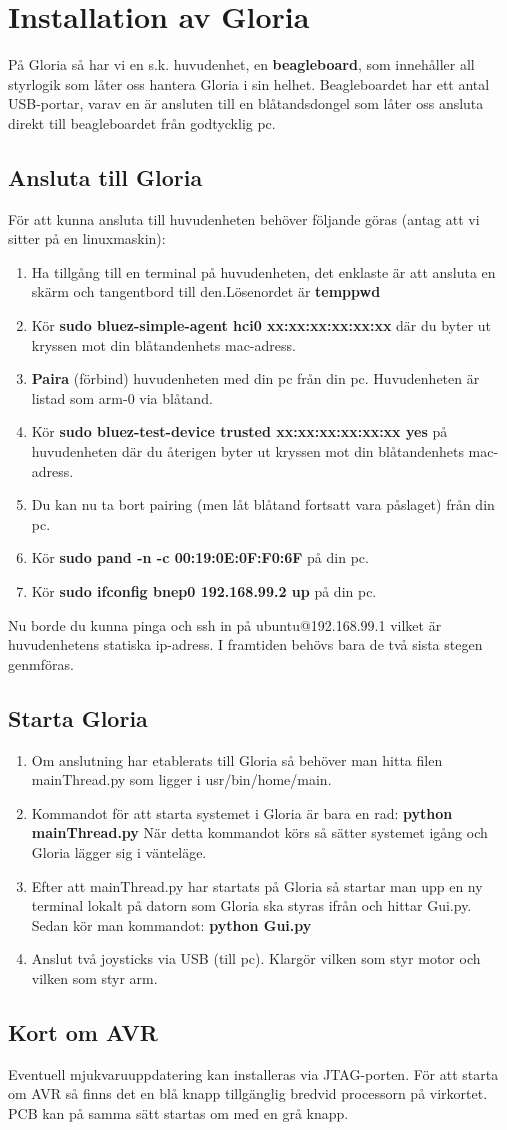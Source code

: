\section{Installation av Gloria}
På Gloria så har vi en s.k. huvudenhet, en \textbf{beagleboard}, som innehåller all styrlogik som låter oss hantera Gloria i sin helhet. Beagleboardet har ett antal USB-portar, varav en är ansluten till en blåtandsdongel som låter oss ansluta direkt till beagleboardet från godtycklig pc.

\subsection{Ansluta till Gloria}
För att kunna ansluta till huvudenheten behöver följande göras (antag att vi sitter på en linuxmaskin):
\begin{enumerate}
	\item Ha tillgång till en terminal på huvudenheten, det enklaste är att ansluta en skärm och tangentbord till den.\newline Lösenordet är \textbf{temppwd}
	\item Kör \textbf{sudo bluez-simple-agent hci0 xx:xx:xx:xx:xx:xx} där du byter ut kryssen mot din blåtandenhets mac-adress.
	\item \textbf{Paira} (förbind) huvudenheten med din pc från din pc. Huvudenheten är listad som arm-0 via blåtand.
	\item Kör \textbf{sudo bluez-test-device trusted xx:xx:xx:xx:xx:xx yes} på huvudenheten där du återigen byter ut kryssen mot din blåtandenhets mac-adress.
	\item Du kan nu ta bort pairing (men låt blåtand fortsatt vara påslaget) från din pc.
	\item Kör \textbf{sudo pand -n -c 00:19:0E:0F:F0:6F	} på din pc.
	\item Kör \textbf{sudo ifconfig bnep0 192.168.99.2 up } på din pc.
\end{enumerate}
Nu borde du kunna pinga och ssh in på ubuntu@192.168.99.1 vilket är huvudenhetens statiska ip-adress. I framtiden behövs bara de två sista stegen genmföras.
\subsection{Starta Gloria}
\begin{enumerate}
	\item Om anslutning har etablerats till Gloria så behöver man hitta filen mainThread.py som ligger i usr/bin/home/main.
	\item Kommandot för att starta systemet i Gloria är bara en rad: \textbf{python mainThread.py}
	När detta kommandot körs så sätter systemet igång och Gloria lägger sig i vänteläge.
	\item Efter att mainThread.py har startats på Gloria så startar man upp en ny terminal lokalt på datorn som Gloria ska styras ifrån och hittar Gui.py. Sedan kör man kommandot: \textbf{python Gui.py}
	\item Anslut två joysticks via USB (till pc). Klargör vilken som styr motor och vilken som styr arm.
\end{enumerate}
\subsection{Kort om AVR}
Eventuell mjukvaruuppdatering kan installeras via JTAG-porten.
\newline
För att starta om AVR så finns det en blå knapp tillgänglig bredvid processorn på virkortet. PCB kan på samma sätt startas om med en grå knapp.
